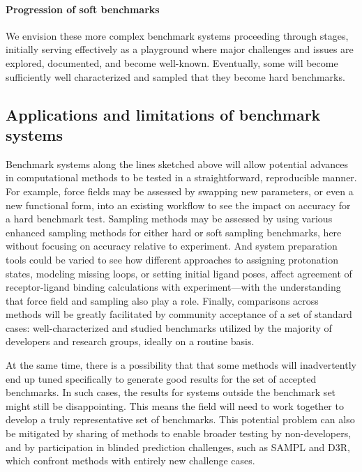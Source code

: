 \documentclass[aps,pre,twocolumn,nofootinbib,superscriptaddress,10pt, final,tightenlines]{revtex4-1}
\begin{document}
\paragraph{Progression of soft benchmarks} We envision these more complex benchmark systems proceeding through stages, initially serving effectively as a playground where major challenges and issues are explored, documented, and become well-known. 
Eventually, some will become sufficiently well characterized and sampled that they become hard benchmarks.

\subsection{Applications and limitations of benchmark systems}
Benchmark systems along the lines sketched above will allow potential advances in computational methods to be tested in a straightforward, reproducible manner. 
For example, force fields may be assessed by swapping new parameters, or even a new functional form, into an existing workflow to see the impact on accuracy for a hard benchmark test.
Sampling methods may be assessed by using various enhanced sampling methods for either hard or soft sampling benchmarks, here without focusing on accuracy relative to experiment.
And system preparation tools could be varied to see how different approaches to assigning protonation states, modeling missing loops, or setting initial ligand poses, affect agreement of receptor-ligand binding calculations with experiment---with the understanding that force field and sampling also play a role. 
Finally, comparisons across methods will be greatly facilitated by community acceptance of a set of standard cases: well-characterized and studied benchmarks utilized by the majority of developers and research groups, ideally on a routine basis.

At the same time, there is a possibility that that some methods will inadvertently end up tuned specifically to generate good results for the set of accepted benchmarks. 
In such cases, the results for systems outside the benchmark set might still be disappointing. 
This means the field will need to work together to develop a truly representative set of benchmarks.
This potential problem can also be mitigated by sharing of methods to enable broader testing by non-developers, and by participation in blinded prediction challenges, such as SAMPL and D3R, which confront methods with entirely new challenge cases. 
\end{document}
